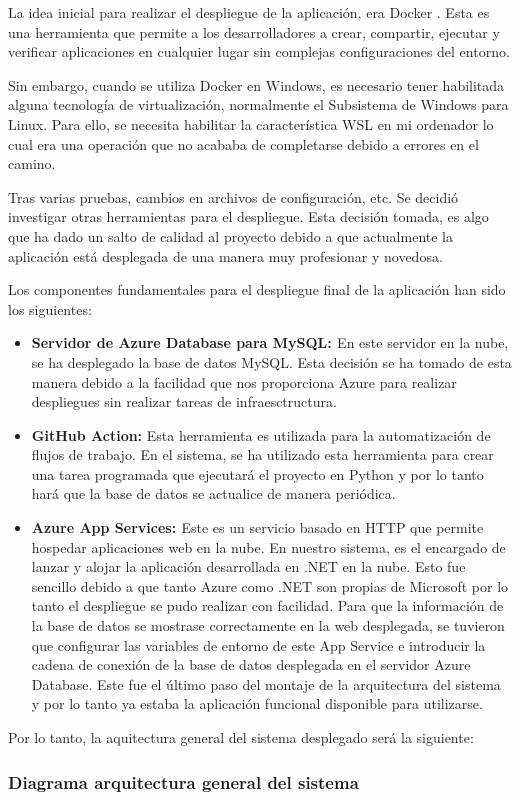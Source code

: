 La idea inicial para realizar el despliegue de la aplicación, era Docker \cite{docker:latex}. Esta es una herramienta que permite a los desarrolladores a crear, compartir, ejecutar y verificar aplicaciones en cualquier lugar sin complejas configuraciones del entorno. 

Sin embargo, cuando se utiliza Docker en Windows, es necesario tener habilitada alguna tecnología de virtualización, normalmente el Subsistema de Windows para Linux. Para ello, se necesita habilitar la característica WSL en mi ordenador lo cual era una operación que no acababa de completarse debido a errores en el camino. 

Tras varias pruebas, cambios en archivos de configuración, etc. Se decidió investigar otras herramientas para el despliegue. Esta decisión tomada, es algo que ha dado un salto de calidad al proyecto debido a que actualmente la aplicación está desplegada de una manera muy profesionar y novedosa.

Los componentes fundamentales para el despliegue final de la aplicación han sido los siguientes:
\begin{itemize}
    \item \textbf{Servidor de Azure Database para MySQL: \cite{azuremysql:latex}} En este servidor en la nube, se ha desplegado la base de datos MySQL. Esta decisión se ha tomado de esta manera debido a la facilidad que nos proporciona Azure para realizar despliegues sin realizar tareas de infraesctructura.
    \item \textbf{GitHub Action:\cite{githubactions:latex}} Esta herramienta es utilizada para la automatización de flujos de trabajo. En el sistema, se ha utilizado esta herramienta para crear una tarea programada que ejecutará el proyecto en Python y por lo tanto hará que la base de datos se actualice de manera periódica.
    \item \textbf{Azure App Services: \cite{azureappservices:latex}} Este es un servicio basado en HTTP que permite hospedar aplicaciones web en la nube. En nuestro sistema, es el encargado de lanzar y alojar la aplicación desarrollada en .NET en la nube. Esto fue sencillo debido a que tanto Azure como .NET son propias de Microsoft por lo tanto el despliegue se pudo realizar con facilidad. Para que la información de la base de datos se mostrase correctamente en la web desplegada, se tuvieron que configurar las variables de entorno de este App Service e introducir la cadena de conexión de la base de datos desplegada en el servidor Azure Database. Este fue el último paso del montaje de la arquitectura del sistema y por lo tanto ya estaba la aplicación funcional disponible para utilizarse. 
\end{itemize}
Por lo tanto, la aquitectura general del sistema desplegado será la siguiente:

\newpage
\begin{landscape}
\subsubsection{Diagrama arquitectura general del sistema}
\vspace{2cm}
\label{img-diagrama-general}   
\end{landscape}
\newpage








